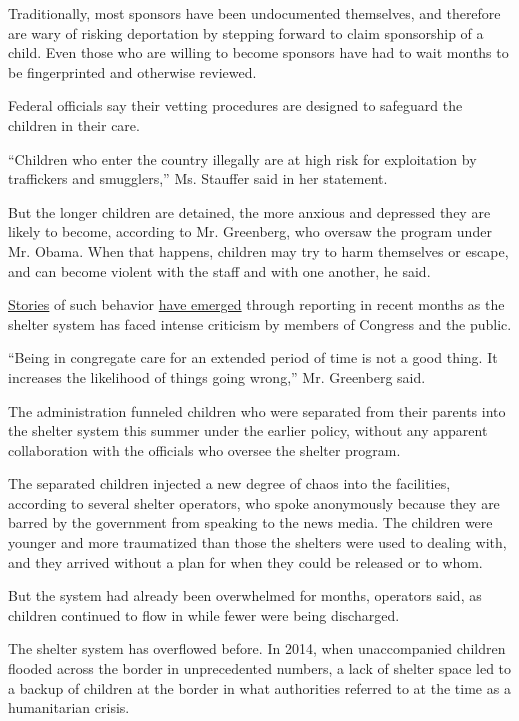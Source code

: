 Traditionally, most sponsors have been undocumented themselves, and
therefore are wary of risking deportation by stepping forward to claim
sponsorship of a child. Even those who are willing to become sponsors
have had to wait months to be fingerprinted and otherwise reviewed.

Federal officials say their vetting procedures are designed to safeguard
the children in their care.

``Children who enter the country illegally are at high risk for
exploitation by traffickers and smugglers,'' Ms. Stauffer said in her
statement.

But the longer children are detained, the more anxious and depressed
they are likely to become, according to Mr. Greenberg, who oversaw the
program under Mr. Obama. When that happens, children may try to harm
themselves or escape, and can become violent with the staff and with one
another, he said.

\href{https://www.nytimes.com/2018/06/24/us/migrant-boy-leaves-texas-shelter.html}{Stories}
of such behavior
\href{https://www.nytimes.com/2018/07/14/us/migrant-children-shelters.html}{have
emerged} through reporting in recent months as the shelter system has
faced intense criticism by members of Congress and the public.

``Being in congregate care for an extended period of time is not a good
thing. It increases the likelihood of things going wrong,'' Mr.
Greenberg said.

The administration funneled children who were separated from their
parents into the shelter system this summer under the earlier policy,
without any apparent collaboration with the officials who oversee the
shelter program.

The separated children injected a new degree of chaos into the
facilities, according to several shelter operators, who spoke
anonymously because they are barred by the government from speaking to
the news media. The children were younger and more traumatized than
those the shelters were used to dealing with, and they arrived without a
plan for when they could be released or to whom.

But the system had already been overwhelmed for months, operators said,
as children continued to flow in while fewer were being discharged.

The shelter system has overflowed before. In 2014, when unaccompanied
children flooded across the border in unprecedented numbers, a lack of
shelter space led to a backup of children at the border in what
authorities referred to at the time as a humanitarian crisis.

